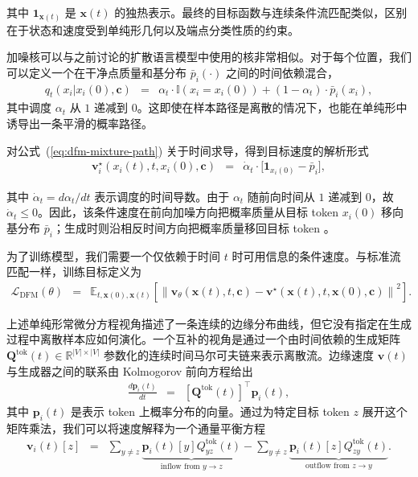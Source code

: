 \documentclass[UTF8,a4paper,zihao=-4,oneside,openany]{ctexbook}
\begin{document}
\noindent 其中 $\mathbf{1}_{\mathbf{x}(t)}$ 是 $\mathbf{x}(t)$ 的独热表示。最终的目标函数与连续条件流匹配类似，区别在于状态和速度受到单纯形几何以及端点分类性质的约束。

加噪核可以与之前讨论的扩散语言模型中使用的核非常相似。对于每个位置，我们可以定义一个在干净点质量和基分布 $\bar{p}_i(\cdot)$ 之间的时间依赖混合，
\begin{eqnarray}
q_t(x_i | x_i(0), \mathbf{c})
& = &
\alpha_t \cdot \mathbb{I}(x_i = x_i(0))
+
(1-\alpha_t) \cdot \bar{p}_i(x_i),
\label{eq:dfm-mixture-path}
\end{eqnarray}
其中调度 $\alpha_t$ 从 $1$ 递减到 $0$。这即使在样本路径是离散的情况下，也能在单纯形中诱导出一条平滑的概率路径。

对公式~(\ref{eq:dfm-mixture-path}) 关于时间求导，得到目标速度的解析形式
\begin{eqnarray}
\mathbf{v}^\star_i(x_i(t), t, x_i(0), \mathbf{c})
& = &
\dot{\alpha}_t \cdot \big[ \mathbf{1}_{x_i(0)} - \bar{p}_i \big],
\label{eq:dfm-analytic-velocity}
\end{eqnarray}

\noindent 其中 $\dot{\alpha}_t = d\alpha_t/dt$ 表示调度的时间导数。由于 $\alpha_t$ 随前向时间从 $1$ 递减到 $0$，故 $\dot{\alpha}_t\leq 0$。因此，该条件速度在前向加噪方向把概率质量从目标 token $x_i(0)$ 移向基分布 $\bar{p}_i$；生成时则沿相反时间方向把概率质量移回目标 token 。

为了训练模型，我们需要一个仅依赖于时间 $t$ 时可用信息的条件速度。与标准流匹配一样，训练目标定义为
\begin{eqnarray}
\mathcal{L}_{\text{DFM}}(\theta)
& = &
\mathbb{E}_{t, \mathbf{x}(0), \mathbf{x}(t)} \left[ \left\| \mathbf{v}_\theta(\mathbf{x}(t), t, \mathbf{c}) - \mathbf{v}^\star(\mathbf{x}(t), t, \mathbf{x}(0), \mathbf{c}) \right\|^2 \right].
\label{eq:dfm-objective}
\end{eqnarray}

上述单纯形常微分方程视角描述了一条连续的边缘分布曲线，但它没有指定在生成过程中离散样本应如何演化。一个互补的视角是通过一个由时间依赖的生成矩阵 $\mathbf{Q}^{\mathrm{tok}}(t) \in \mathbb{R}^{|V| \times |V|}$ 参数化的连续时间马尔可夫链来表示离散流。边缘速度 $\mathbf{v}(t)$ 与生成器之间的联系由 Kolmogorov 前向方程给出
\begin{eqnarray}
\frac{d\mathbf{p}_i(t)}{dt} & = & \left[ \mathbf{Q}^{\mathrm{tok}}(t) \right]^\top \mathbf{p}_i(t),
\label{eq:kolmogorov-forward}
\end{eqnarray}
其中 $\mathbf{p}_i(t)$ 是表示 token 上概率分布的向量。通过为特定目标 token $z$ 展开这个矩阵乘法，我们可以将速度解释为一个通量平衡方程
\begin{eqnarray}
\mathbf{v}_i(t)[z]
& = &
\sum_{y \neq z} \underbrace{\mathbf{p}_i(t)[y] Q^{\mathrm{tok}}_{yz}(t)}_{\text{inflow from } y \to z}
-
\sum_{y \neq z} \underbrace{\mathbf{p}_i(t)[z] Q^{\mathrm{tok}}_{zy}(t)}_{\text{outflow from } z \to y}.
\label{eq:master-equation-Q}
\end{eqnarray}
\end{document}
